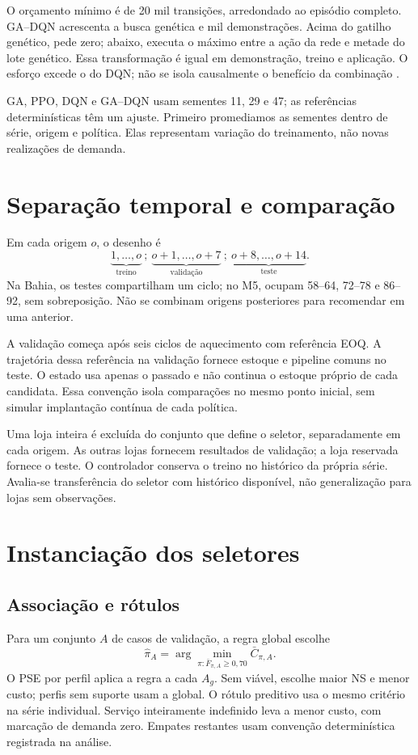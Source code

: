 O orçamento mínimo é de 20 mil transições, arredondado ao episódio completo. GA--DQN acrescenta a busca genética e mil demonstrações. Acima do gatilho genético, pede zero; abaixo, executa o máximo entre a ação da rede e metade do lote genético. Essa transformação é igual em demonstração, treino e aplicação. O esforço excede o do DQN; não se isola causalmente o benefício da combinação \citep{Zabraoui2025GaDQN}.

GA, PPO, DQN e GA--DQN usam sementes 11, 29 e 47; as referências determinísticas têm um ajuste. Primeiro promediamos as sementes dentro de série, origem e política. Elas representam variação do treinamento, não novas realizações de demanda.

\section{Separação temporal e comparação}
\label{sec:simulacao_benchmark}\label{sec:wf_protocol}
Em cada origem $o$, o desenho é
\begin{equation}
 \underbrace{1,\ldots,o}_{\text{treino}}\ ;\
 \underbrace{o+1,\ldots,o+7}_{\text{validação}}\ ;\
 \underbrace{o+8,\ldots,o+14}_{\text{teste}}.
 \label{eq:wf_splits}
\end{equation}
Na Bahia, os testes compartilham um ciclo; no M5, ocupam 58--64, 72--78 e 86--92, sem sobreposição. Não se combinam origens posteriores para recomendar em uma anterior.

A validação começa após seis ciclos de aquecimento com referência EOQ. A trajetória dessa referência na validação fornece estoque e pipeline comuns no teste. O estado usa apenas o passado e não continua o estoque próprio de cada candidata. Essa convenção isola comparações no mesmo ponto inicial, sem simular implantação contínua de cada política.

Uma loja inteira é excluída do conjunto que define o seletor, separadamente em cada origem. As outras lojas fornecem resultados de validação; a loja reservada fornece o teste. O controlador conserva o treino no histórico da própria série. Avalia-se transferência do seletor com histórico disponível, não generalização para lojas sem observações.

\section{Instanciação dos seletores}
\label{sec:selecao_contextual}
\subsection{Associação e rótulos}
Para um conjunto $A$ de casos de validação, a regra global escolhe
\begin{equation}
 \hat\pi_A=\arg\min_{\pi:\bar F_{\pi,A}\geq0{,}70}\bar C_{\pi,A}.
 \label{eq:policy_selector}
\end{equation}
O PSE por perfil aplica a regra a cada $A_g$. Sem viável, escolhe maior NS e menor custo; perfis sem suporte usam a global. O rótulo preditivo usa o mesmo critério na série individual. Serviço inteiramente indefinido leva a menor custo, com marcação de demanda zero. Empates restantes usam convenção determinística registrada na análise.

